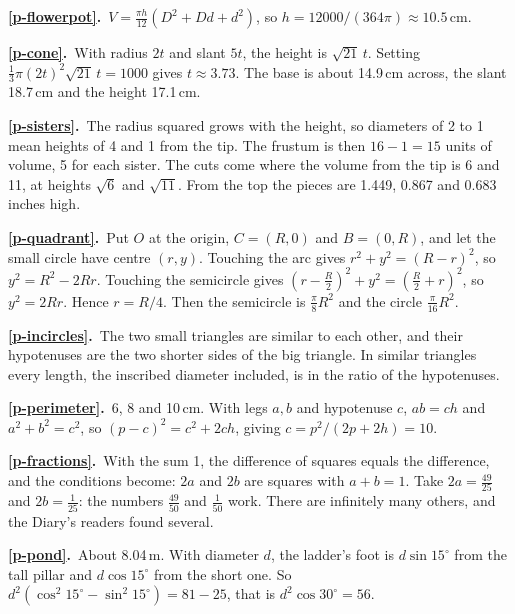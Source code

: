\documentclass[11pt,a4paper]{article}
\newcommand{\ans}[2]{\par\smallskip\noindent\textbf{\ref{#1}.}\ #2}
\begin{document}
\ans{p-flowerpot}{$V = \tfrac{\pi h}{12}(D^2+Dd+d^2)$, so $h = 12000/(364\pi)\approx
10.5$\,cm.}
\ans{p-cone}{With radius $2t$ and slant $5t$, the height is $\sqrt{21}\,t$. Setting
$\tfrac13\pi(2t)^2\sqrt{21}\,t = 1000$ gives $t\approx3.73$. The base is about 14.9\,cm
across, the slant 18.7\,cm and the height 17.1\,cm.}
\ans{p-sisters}{The radius squared grows with the height, so diameters of 2 to 1 mean
heights of 4 and 1 from the tip. The frustum is then $16-1 = 15$ units of volume, 5 for
each sister. The cuts come where the volume from the tip is 6 and 11, at heights
$\sqrt6$ and $\sqrt{11}$. From the top the pieces are 1.449, 0.867 and 0.683 inches
high.}
\ans{p-quadrant}{Put $O$ at the origin, $C = (R,0)$ and $B = (0,R)$, and let the small
circle have centre $(r,y)$. Touching the arc gives $r^2 + y^2 = (R-r)^2$, so $y^2 =
R^2 - 2Rr$. Touching the semicircle gives $(r-\tfrac R2)^2 + y^2 = (\tfrac R2 + r)^2$,
so $y^2 = 2Rr$. Hence $r = R/4$. Then the semicircle is $\tfrac\pi8 R^2$ and the circle
$\tfrac\pi{16}R^2$.}
\ans{p-incircles}{The two small triangles are similar to each other, and their
hypotenuses are the two shorter sides of the big triangle. In similar triangles every
length, the inscribed diameter included, is in the ratio of the hypotenuses.}
\ans{p-perimeter}{6, 8 and 10\,cm. With legs $a, b$ and hypotenuse $c$, $ab = ch$ and
$a^2+b^2 = c^2$, so $(p-c)^2 = c^2 + 2ch$, giving $c = p^2/(2p+2h) = 10$.}
\ans{p-fractions}{With the sum 1, the difference of squares equals the difference, and the
conditions become: $2a$ and $2b$ are squares with $a+b = 1$. Take $2a = \tfrac{49}{25}$
and $2b = \tfrac1{25}$: the numbers $\tfrac{49}{50}$ and $\tfrac1{50}$ work. There are
infinitely many others, and the Diary's readers found several.}
\ans{p-pond}{About 8.04\,m. With diameter $d$, the ladder's foot is $d\sin15^\circ$ from
the tall pillar and $d\cos15^\circ$ from the short one. So $d^2(\cos^2 15^\circ -
\sin^2 15^\circ) = 81 - 25$, that is $d^2\cos30^\circ = 56$.}
\end{document}

